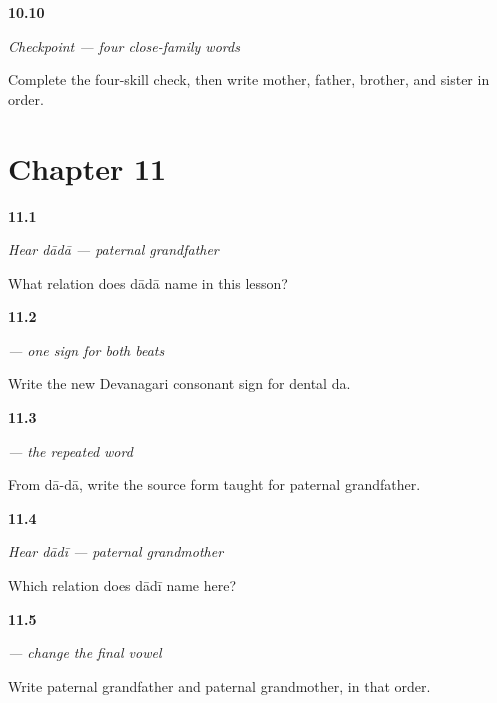\noindent\begin{minipage}[t]{\linewidth}
\raggedright
\hypertarget{review-MW-C08-family-four-payoff}{\textbf{10.10}} \emph{Checkpoint — four close-family words}\par
\small Complete the four-skill check, then write mother, father, brother, and sister in order.
\end{minipage}\par\medskip

\section*{Chapter 11}

\noindent\begin{minipage}[t]{\linewidth}
\raggedright
\hypertarget{review-MW-C08-hear-dada-meaning}{\textbf{11.1}} \emph{Hear \emph{dādā} — paternal grandfather}\par
\small What relation does dādā name in this lesson?
\end{minipage}\par\medskip

\noindent\begin{minipage}[t]{\linewidth}
\raggedright
\hypertarget{review-MW-W08-da-write}{\textbf{11.2}} \emph{ — one sign for both beats}\par
\small Write the new Devanagari consonant sign for dental da.
\end{minipage}\par\medskip

\noindent\begin{minipage}[t]{\linewidth}
\raggedright
\hypertarget{review-MW-C08-dada-dictation}{\textbf{11.3}} \emph{ — the repeated word}\par
\small From dā-dā, write the source form taught for paternal grandfather.
\end{minipage}\par\medskip

\noindent\begin{minipage}[t]{\linewidth}
\raggedright
\hypertarget{review-MW-C08-hear-dadi-meaning}{\textbf{11.4}} \emph{Hear \emph{dādī} — paternal grandmother}\par
\small Which relation does dādī name here?
\end{minipage}\par\medskip

\noindent\begin{minipage}[t]{\linewidth}
\raggedright
\hypertarget{review-MW-C08-dadi-grandparent-pair}{\textbf{11.5}} \emph{ — change the final vowel}\par
\small Write paternal grandfather and paternal grandmother, in that order.
\end{minipage}\par\medskip

